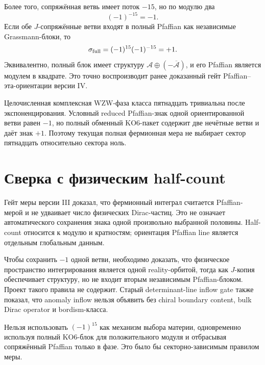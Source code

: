 Более того, сопряжённая ветвь имеет поток $-15$, но по модулю два
\begin{equation}
 (-1)^{-15}=-1.
\end{equation}
Если обе $J$-сопряжённые ветви входят в полный Pfaffian как независимые
Grassmann-блоки, то
\begin{equation}
 \sigma_{\rm full}=(-1)^{15}(-1)^{-15}=+1.
 \label{eq:v5-full-real-pfaffian-phase}
\end{equation}
Эквивалентно, полный блок имеет структуру
$\mathcal A\oplus(-\overline{\mathcal A})$, и его Pfaffian является
модулем в квадрате. Это точно воспроизводит ранее доказанный гейт
Pfaffian--эта-ориентации версии IV.

\begin{theorem}
Целочисленная комплексная WZW-фаза класса пятнадцать тривиальна после
экспоненцирования. Условный reduced Pfaffian-знак одной ориентированной
ветви равен $-1$, но полный обменный KO6-пакет содержит две нечётные
ветви и даёт знак $+1$. Поэтому текущая полная фермионная мера не выбирает
сектор пятнадцать относительно сектора ноль.
\end{theorem}

\section{Сверка с физическим half-count}

Гейт меры версии III доказал, что фермионный интеграл считается
Pfaffian-мерой и не удваивает число физических Dirac-частиц. Это не
означает автоматического сохранения знака одной произвольно выбранной
половины. Half-count относится к модулю и кратностям; ориентация Pfaffian
line является отдельным глобальным данным.

Чтобы сохранить $-1$ одной ветви, необходимо доказать, что физическое
пространство интегрирования является одной reality-орбитой, тогда как
$J$-копия обеспечивает структуру, но не входит вторым независимым
Pfaffian-блоком. Проект такого правила не содержит. Старый
determinant-line inflow gate также показал, что anomaly inflow нельзя
объявить без chiral boundary content, bulk Dirac operator и bordism-класса.

\begin{nogocriterion}
Нельзя использовать $(-1)^{15}$ как механизм выбора материи, одновременно
используя полный KO6-блок для положительного модуля и отбрасывая
сопряжённый Pfaffian только в фазе. Это было бы секторно-зависимым правилом
меры.
\end{nogocriterion}

